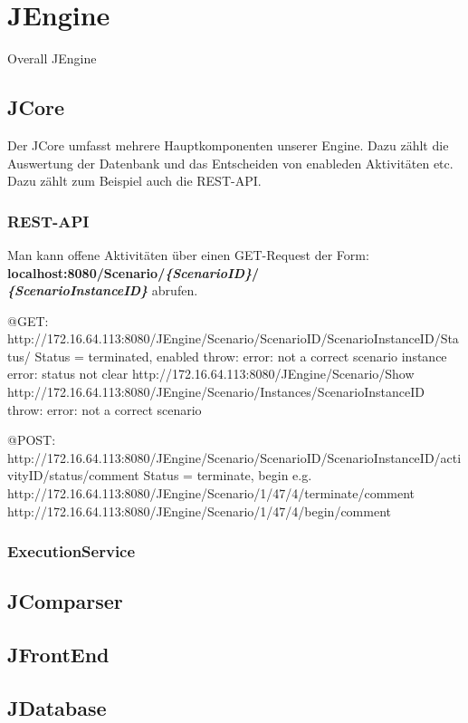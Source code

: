 \documentclass{acm_proc_article-sp}
\begin{document}
%
%
\section{JEngine}
Overall JEngine

%
%
\subsection{JCore}
Der JCore umfasst mehrere Hauptkomponenten unserer Engine. Dazu zählt die Auswertung der Datenbank und das Entscheiden von enableden Aktivitäten etc.\\
Dazu zählt zum Beispiel auch die REST-API.

%
%
\subsubsection{REST-API}
Man kann offene Aktivitäten über einen GET-Request der Form: \textbf{localhost:8080/Scenario/\textit{\{ScenarioID\}}/\\\textit{\{ScenarioInstanceID\}}} abrufen.


@GET:  http://172.16.64.113:8080/JEngine/Scenario/{ScenarioID}/{ScenarioInstanceID}/{Status}/
Status = {terminated, enabled}
throw: error: not a correct scenario instance
error: status not clear
http://172.16.64.113:8080/JEngine/Scenario/Show
http://172.16.64.113:8080/JEngine/Scenario/Instances/{ScenarioInstanceID}
throw: error: not a correct scenario

@POST:  http://172.16.64.113:8080/JEngine/Scenario/ScenarioID/ScenarioInstanceID/activityID/status/comment
Status = {terminate, begin}
e.g. http://172.16.64.113:8080/JEngine/Scenario/1/47/4/terminate/comment
http://172.16.64.113:8080/JEngine/Scenario/1/47/4/begin/comment
%
%
\subsubsection{ExecutionService}

%
%
\subsection{JComparser}

%
%
\subsection{JFrontEnd}

%
%
\subsection{JDatabase}
\end{document}
